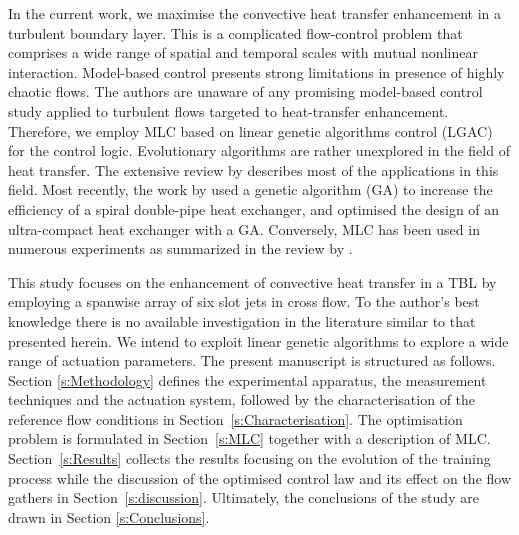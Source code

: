 In the current work, we maximise the convective heat transfer enhancement in a turbulent boundary layer. This is a complicated flow-control problem that comprises a wide range of spatial and temporal scales with mutual nonlinear interaction. Model-based control presents strong limitations in presence of highly chaotic flows. The authors are unaware of any promising model-based control study applied to turbulent flows targeted to heat-transfer enhancement. Therefore, we employ MLC based on linear genetic algorithms control (LGAC) for the control logic. Evolutionary algorithms are rather unexplored in the field of heat transfer. The extensive review by \citet{Gosselin2009GareviewHT} describes most of the applications in this field. Most recently, the work by \citet{Tian2020GAheatexchanger} used a genetic algorithm (GA) to increase the efficiency of a spiral double-pipe heat exchanger, and \citet{Moon2021GA-HE} optimised the design of an ultra-compact heat exchanger with a GA. Conversely, MLC has been used in numerous experiments as summarized in the review by \citet{Noack2019control}. %

This study focuses on the enhancement of convective heat transfer in a TBL by employing a spanwise array of six slot jets in cross flow. To the author's best knowledge there is no available investigation in the literature similar to that presented herein. We intend to exploit linear genetic algorithms to explore a wide range of actuation parameters. The present manuscript is structured as follows. Section \ref{s:Methodology} defines the experimental apparatus, the measurement techniques and the actuation system, followed by the characterisation of the reference flow conditions in Section~\ref{s:Characterisation}. The optimisation problem is formulated in Section~\ref{s:MLC} together with a description of MLC. Section~\ref{s:Results} collects the results focusing on the evolution of the training process while the discussion of the optimised control law and its effect on the flow gathers in Section~\ref{s:discussion}. Ultimately, the conclusions of the study are drawn in Section \ref{s:Conclusions}.

